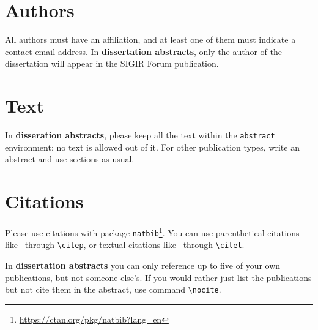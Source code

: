 \documentclass[news]{sigirforum}
\begin{document}
\section{Authors}

All authors must have an affiliation, and at least one of them must indicate a contact email address. In \textbf{dissertation abstracts}, only the author of the dissertation will appear in the SIGIR Forum publication.

\section{Text}

In \textbf{disseration abstracts}, please keep all the text within the \texttt{abstract} environment; no text is allowed out of it. For other publication types, write an abstract and use sections as usual.

\section{Citations}

Please use citations with package \texttt{natbib}\footnote{\url{https://ctan.org/pkg/natbib?lang=en}}.
You can use parenthetical citations like~\citep{forum} through \texttt{\textbackslash citep}, or textual citations like~\citet{forum} through \texttt{\textbackslash citet}.

In \textbf{dissertation abstracts} you can only reference up to five of your own publications, but not someone else's. If you would rather just list the publications but not cite them in the abstract, use command \texttt{\textbackslash nocite}.


\end{document}
